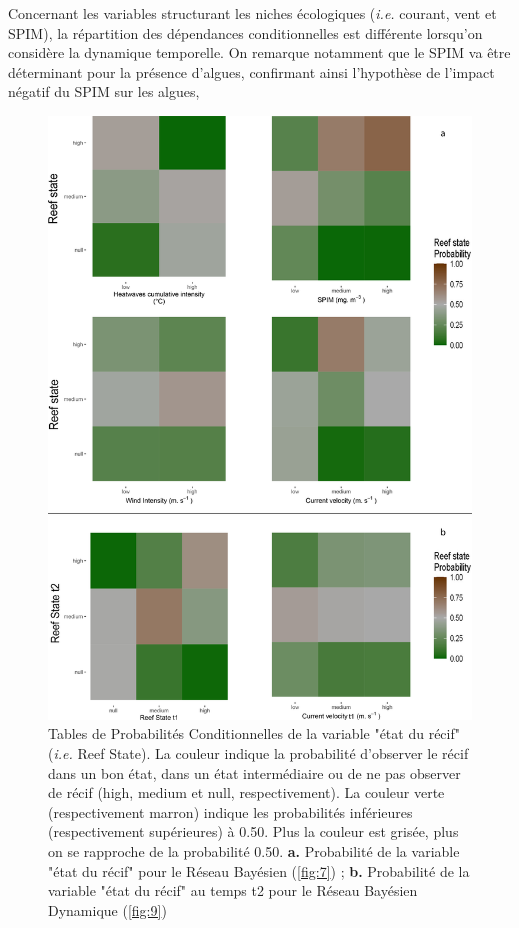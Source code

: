 \documentclass[12pt]{report}
\begin{document}
Concernant les variables structurant les niches écologiques (\textit{i.e.} courant, vent et SPIM), la répartition des dépendances conditionnelles est différente lorsqu'on considère la dynamique temporelle. On remarque notamment que le SPIM va être déterminant pour la présence d'algues, confirmant ainsi l'hypothèse de l'impact négatif du SPIM sur les algues,\begin{figure}
    \centering
    \includegraphics[width = .7\linewidth]{CPT_bn_dbn.jpg}
    \caption[Tables de Probabilités Conditionnelles de la variable Récif à partir du Réseau Bayésien et du Réseau Bayésien Dynamique]{Tables de Probabilités Conditionnelles de la variable "état du récif" (\textit{i.e.} Reef State). La couleur indique la probabilité d'observer le récif dans un bon état, dans un état intermédiaire ou de ne pas observer de récif (high, medium et null, respectivement). La couleur verte (respectivement marron) indique les probabilités inférieures (respectivement supérieures) à 0.50. Plus la couleur est grisée, plus on se rapproche de la probabilité 0.50. \textbf{a.} Probabilité de la variable "état du récif" pour le Réseau Bayésien (\autoref{fig:7}) ; \textbf{b.} Probabilité de la variable "état du récif" au temps t2 pour le Réseau Bayésien Dynamique (\autoref{fig:9})}
    \label{fig:8}

\end{figure}
\end{document}
